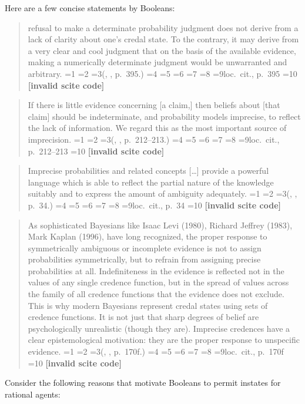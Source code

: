\documentclass[journal]{IEEEtran}
\newcommand{\fcut}[1]{}
\newif\ifNumericalOrYear
\newcommand{\PageP}{p.~}
\newcommand{\PageP}{}
\newcommand{\scite}[3]{\ifnum#1=1\ifNumericalOrYear\citep{#2}\else\citeyearpar{#2}\fi\else
\ifnum#1=2\ifNumericalOrYear\citep[#3]{#2}\else\citep[{\PageP}#3]{#2}\fi\else
\ifnum#1=3\ifNumericalOrYear(\citet[#3]{#2})\else(\citeauthor{#2}, \citeyear{#2}, {\PageP}#3.)\fi\else
\ifnum#1=4\ifNumericalOrYear\citet{#2}\else\citet{#2}\fi\else
\ifnum#1=5\ifNumericalOrYear(\citet{#2})\else\citep{#2}\fi\else
\ifnum#1=6\ifNumericalOrYear(\citet[#3]{#2})\else\citep[{\PageP}#3]{#2}\fi\else
\ifnum#1=7\ifNumericalOrYear\citep{#2}\else\citealp{#2}\fi\else
\ifnum#1=8\ifNumericalOrYear\citep[#3]{#2}\else\citealp[{\PageP}#3]{#2}\fi\else
\ifnum#1=9\ifNumericalOrYear\citep[#3]{#2}\else{}loc.\ cit., {\PageP}#3\fi\else
\ifnum#1=10\ifNumericalOrYear\citep{#2}\else\citeyear{#2}\fi\else
\textbf{[invalid scite code]}\fi\fi\fi\fi\fi\fi\fi\fi\fi\fi}
\newenvironment{quotex}{\begin{quote}\begin{footnotesize}}{\end{footnotesize}\end{quote}}
\begin{document}
Here are a few concise statements by Booleans:

\begin{quotex}
  [A] refusal to make a determinate probability judgment does not
  derive from a lack of clarity about one's credal state. To the
  contrary, it may derive from a very clear and cool judgment that on
  the basis of the available evidence, making a numerically
  determinate judgment would be unwarranted and arbitrary.
  \scite{3}{levi85}{395}
\end{quotex}

\begin{quotex}
  If there is little evidence concerning [a claim,] then beliefs about
  [that claim] should be indeterminate, and probability models
  imprecise, to reflect the lack of information. We regard this as the
  most important source of imprecision. \scite{3}{walley91}{212--213}
\end{quotex}

\begin{quotex}
  Imprecise probabilities and related concepts [{\ldots}] provide a
  powerful language which is able to reflect the partial nature of the
  knowledge suitably and to express the amount of ambiguity
  adequately. \scite{3}{augustin03}{34}
\end{quotex}

\begin{quotex}
  As sophisticated Bayesians like Isaac Levi (1980), Richard Jeffrey
  (1983), Mark Kaplan (1996), have long recognized, the proper
  response to symmetrically ambiguous or incomplete evidence is not to
  assign probabilities symmetrically, but to refrain from assigning
  precise probabilities at all. Indefiniteness in the evidence is
  reflected not in the values of any single credence function, but in
  the spread of values across the family of all credence functions
  that the evidence does not exclude. This is why modern Bayesians
  represent credal states using sets of credence functions. It is not
  just that sharp degrees of belief are psychologically unrealistic
  (though they are). Imprecise credences have a clear epistemological
  motivation: they are the proper response to unspecific evidence.
  \scite{3}{joyce05}{170f}
\end{quotex}\fcut{4}

Consider the following reasons that motivate Booleans to permit
instates for rational agents:
\end{document}
